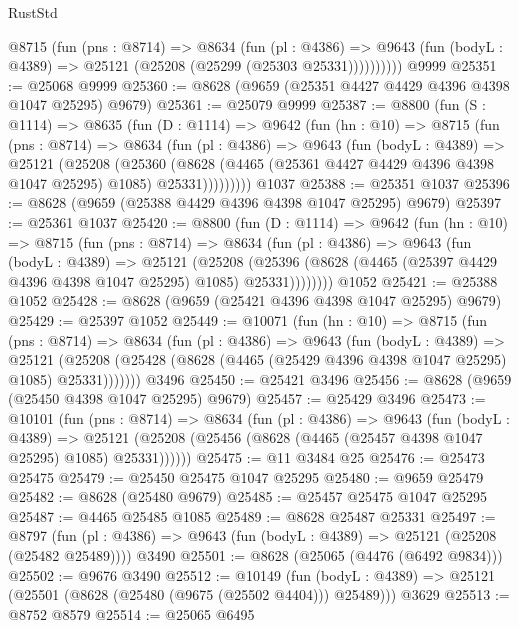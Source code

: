 \begin{lexlean}{RustStd}
\begin{coremodule}
          @8715
            (fun (pns : @8714) =>
            @8634
              (fun (pl : @4386) =>
              @9643 (fun (bodyL : @4389) => @25121 (@25208 (@25299 (@25303 @25331))))))))))
    @9999
@25351 := @25068 @9999
@25360 := @8628 (@9659 (@25351 @4427 @4429 @4396 @4398 @1047 @25295) @9679)
@25361 := @25079 @9999
@25387 := @8800
    (fun (S : @1114) =>
    @8635
      (fun (D : @1114) =>
      @9642
        (fun (hn : @10) =>
        @8715
          (fun (pns : @8714) =>
          @8634
            (fun (pl : @4386) =>
            @9643
              (fun (bodyL : @4389) =>
              @25121
                (@25208
                  (@25360
                    (@8628
                      (@4465 (@25361 @4427 @4429 @4396 @4398 @1047 @25295) @1085)
                      @25331)))))))))
    @1037
@25388 := @25351 @1037
@25396 := @8628 (@9659 (@25388 @4429 @4396 @4398 @1047 @25295) @9679)
@25397 := @25361 @1037
@25420 := @8800
    (fun (D : @1114) =>
    @9642
      (fun (hn : @10) =>
      @8715
        (fun (pns : @8714) =>
        @8634
          (fun (pl : @4386) =>
          @9643
            (fun (bodyL : @4389) =>
            @25121
              (@25208
                (@25396 (@8628 (@4465 (@25397 @4429 @4396 @4398 @1047 @25295) @1085) @25331))))))))
    @1052
@25421 := @25388 @1052
@25428 := @8628 (@9659 (@25421 @4396 @4398 @1047 @25295) @9679)
@25429 := @25397 @1052
@25449 := @10071
    (fun (hn : @10) =>
    @8715
      (fun (pns : @8714) =>
      @8634
        (fun (pl : @4386) =>
        @9643
          (fun (bodyL : @4389) =>
          @25121
            (@25208 (@25428 (@8628 (@4465 (@25429 @4396 @4398 @1047 @25295) @1085) @25331)))))))
    @3496
@25450 := @25421 @3496
@25456 := @8628 (@9659 (@25450 @4398 @1047 @25295) @9679)
@25457 := @25429 @3496
@25473 := @10101
    (fun (pns : @8714) =>
    @8634
      (fun (pl : @4386) =>
      @9643
        (fun (bodyL : @4389) =>
        @25121 (@25208 (@25456 (@8628 (@4465 (@25457 @4398 @1047 @25295) @1085) @25331))))))
@25475 := @11 @3484 @25
@25476 := @25473 @25475
@25479 := @25450 @25475 @1047 @25295
@25480 := @9659 @25479
@25482 := @8628 (@25480 @9679)
@25485 := @25457 @25475 @1047 @25295
@25487 := @4465 @25485 @1085
@25489 := @8628 @25487 @25331
@25497 := @8797
    (fun (pl : @4386) => @9643 (fun (bodyL : @4389) => @25121 (@25208 (@25482 @25489))))
    @3490
@25501 := @8628 (@25065 (@4476 (@6492 @9834)))
@25502 := @9676 @3490
@25512 := @10149
    (fun (bodyL : @4389) => @25121 (@25501 (@8628 (@25480 (@9675 (@25502 @4404))) @25489)))
    @3629
@25513 := @8752 @8579
@25514 := @25065 @6495

\end{coremodule}
\end{lexlean}
